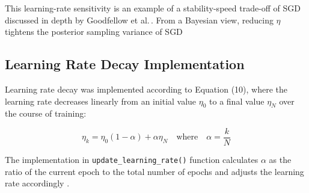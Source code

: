 \documentclass{article}
\begin{document}
This learning-rate sensitivity is an example of a
stability-speed trade-off of SGD discussed in depth by 
Goodfellow et al.\,\cite{goodfellow2016deep}. From a Bayesian view, 
reducing $\eta$ tightens the posterior sampling variance of 
SGD \cite{mandt2017stochastic}

\subsection{Learning Rate Decay Implementation}

Learning rate decay was implemented according to Equation (10), where the learning rate decreases 
linearly from an initial value $\eta_0$ to a final value $\eta_N$ over the course of training:

\begin{equation}
\eta_{k} = \eta_{0}(1-\alpha) + \alpha\eta_{N} \quad \text{where} \quad \alpha = \frac{k}{N}
\end{equation}

The implementation in \texttt{update\_learning\_rate()} function calculates $\alpha$ as the 
ratio of the current epoch to the total number of epochs and adjusts the learning rate 
accordingly \cite{smith2017cyclical}.
\end{document}
